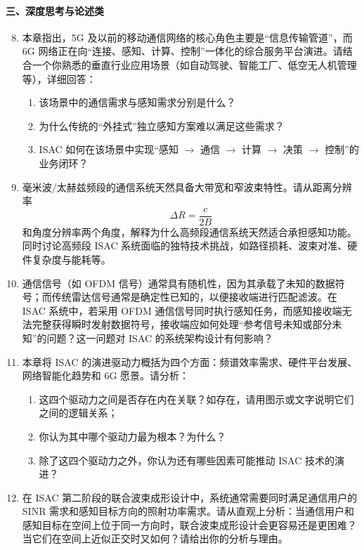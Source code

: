 \paragraph{三、深度思考与论述类}
\begin{enumerate}
    \setcounter{enumi}{7}
    \item 本章指出，5G 及以前的移动通信网络的核心角色主要是“信息传输管道”，而 6G 网络正在向“连接、感知、计算、控制”一体化的综合服务平台演进。请结合一个你熟悉的垂直行业应用场景（如自动驾驶、智能工厂、低空无人机管理等），详细回答：
    \begin{enumerate}
        \item 该场景中的通信需求与感知需求分别是什么？
        \item 为什么传统的“外挂式”独立感知方案难以满足这些需求？
        \item ISAC 如何在该场景中实现“感知 $\rightarrow$ 通信 $\rightarrow$ 计算 $\rightarrow$ 决策 $\rightarrow$ 控制”的业务闭环？
    \end{enumerate}

    \item 毫米波/太赫兹频段的通信系统天然具备大带宽和窄波束特性。请从距离分辨率
    \[
        \Delta R = \frac{c}{2B}
    \]
    和角度分辨率两个角度，解释为什么高频段通信系统天然适合承担感知功能。同时讨论高频段 ISAC 系统面临的独特技术挑战，如路径损耗、波束对准、硬件复杂度与能耗等。

    \item 通信信号（如 OFDM 信号）通常具有随机性，因为其承载了未知的数据符号；而传统雷达信号通常是确定性已知的，以便接收端进行匹配滤波。在 ISAC 系统中，若采用 OFDM 通信信号同时执行感知任务，而感知接收端无法完整获得瞬时发射数据符号，接收端应如何处理“参考信号未知或部分未知”的问题？这一问题对 ISAC 的系统架构设计有何影响？

    \item 本章将 ISAC 的演进驱动力概括为四个方面：频谱效率需求、硬件平台发展、网络智能化趋势和 6G 愿景。请分析：
    \begin{enumerate}
        \item 这四个驱动力之间是否存在内在关联？如存在，请用图示或文字说明它们之间的逻辑关系；
        \item 你认为其中哪个驱动力最为根本？为什么？
        \item 除了这四个驱动力之外，你认为还有哪些因素可能推动 ISAC 技术的演进？
    \end{enumerate}

    \item 在 ISAC 第二阶段的联合波束成形设计中，系统通常需要同时满足通信用户的 SINR 需求和感知目标方向的照射功率需求。请从直观上分析：当通信用户和感知目标在空间上位于同一方向时，联合波束成形设计会更容易还是更困难？当它们在空间上近似正交时又如何？请给出你的分析与理由。
\end{enumerate}


